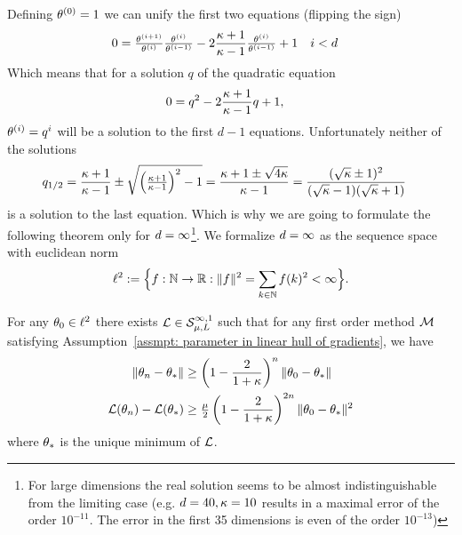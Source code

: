Defining \(\weights^{(0)} =1\) we can unify the first two equations (flipping
the sign)
\begin{align*}
	0&= 
	\tfrac{\weights^{(i+1)}}{\weights^{(i)}}\tfrac{\weights^{(i)}}{\weights^{(i-1)}}
	- 2\frac{\condition+1}{\condition -1}\tfrac{\weights^{(i)}}{\weights^{(i-1)}}
	+ 1  && i <d
\end{align*}
%
Which means that for a solution \(q\) of the quadratic equation
\begin{align}\label{eq: coloring solution quadratic equation}
	0&= q^2 - 2\frac{\condition+1}{\condition -1}q + 1,
\end{align}
%
\(\weights^{(i)} = q^i\) will be a solution to the first \(d-1\) equations.
Unfortunately neither of the solutions
%
\begin{align*}
	q_{1/2} &= \frac{\condition+1}{\condition -1} \pm 
	\sqrt{\left(\tfrac{\condition+1}{\condition-1}\right)^2 -1}
	=\frac{\condition +1 \pm \sqrt{4\condition}}{\condition -1}
	= \frac{(\sqrt{\condition}\pm 1)^2}{(\sqrt{\condition}-1)(\sqrt{\condition}+1)}
\end{align*}
%
is a solution to the last equation. Which is why we are going to formulate the
following theorem only for \(\dimension=\infty\)\footnote{
	For large dimensions the real solution seems to be almost
	indistinguishable from the limiting case (e.g. \(\dimension=40,
	\condition=10\) results in a maximal error of the order \(10^{-11}\). The
	error in the first 35 dimensions is even of the order \(10^{-13}\))
}.
We formalize \(\dimension=\infty\) as the sequence space with euclidean norm
\begin{align*}
	\sequenceSpace := \Big\{
		f:\naturals \to \reals : \| f\|^2 = \sum_{k\in\naturals} f(k)^2< \infty
	\Big\}.
\end{align*}
%
\begin{theorem}
	For any \(\weights_0\in\sequenceSpace\) there exists
	\(\loss\in\strongConvex[\infty,1]{\lbound}{\ubound}\) such that for any
	first order method \(\firstOrderMethod\) satisfying Assumption~\ref{assmpt:
	parameter in linear hull of gradients}, we have
	\begin{subequations}
	\begin{align}
		\|\weights_n - \minimum\|
		&\ge \left(1-\frac2{1+\condition}\right)^n \|\weights_0 - \minimum\| \\
		\loss(\weights_n) - \loss(\minimum)
		&\ge \tfrac{\lbound}{2}
		\left(1-\frac2{1+\condition}\right)^{2n} \|\weights_0 - \minimum\|^2
	\end{align}
	\end{subequations}
	where \(\minimum\) is the unique minimum of \(\loss\).
\end{theorem}
